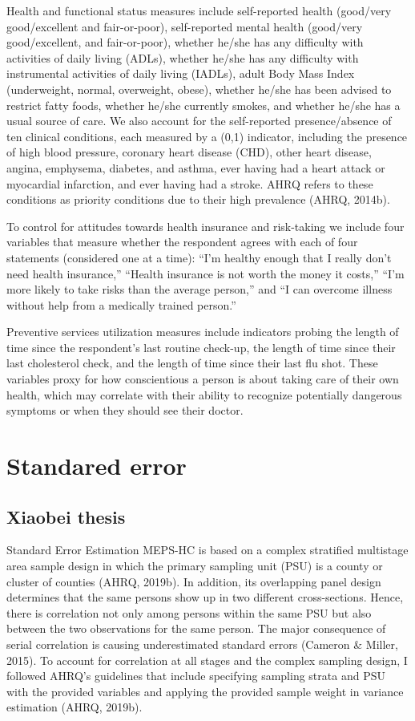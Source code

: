 \documentclass[../main.tex]{subfiles}
\begin{document}
Health and functional status measures include self-reported health (good/very good/excellent and fair-or-poor), self-reported mental health (good/very good/excellent, and fair-or-poor), whether he/she has any difficulty with activities of daily living (ADLs), whether he/she has any difficulty with instrumental activities of daily living (IADLs), adult Body Mass Index (underweight, normal, overweight, obese), whether he/she has been advised to restrict fatty foods, whether he/she currently smokes, and whether he/she has a usual source of care. We also account for the self-reported presence/absence of ten clinical conditions, each measured by a (0,1) indicator, including the presence of high blood pressure, coronary heart disease (CHD), other heart disease, angina, emphysema, diabetes, and asthma, ever having had a heart attack or myocardial infarction, and ever having had a stroke. AHRQ refers to these conditions as priority conditions due to their high prevalence (AHRQ, 2014b).

To control for attitudes towards health insurance and risk-taking we include four variables that measure whether the respondent agrees with each of four statements (considered one at a time): “I'm healthy enough that I really don't need health insurance,” “Health insurance is not worth the money it costs,” “I'm more likely to take risks than the average person,” and “I can overcome illness without help from a medically trained person.”

Preventive services utilization measures include indicators probing the length of time since the respondent's last routine check-up, the length of time since their last cholesterol check, and the length of time since their last flu shot. These variables proxy for how conscientious a person is about taking care of their own health, which may correlate with their ability to recognize potentially dangerous symptoms or when they should see their doctor.

\section{Standared error}
\subsection{Xiaobei thesis }

Standard Error Estimation MEPS-HC is based on a complex stratified multistage area sample design in which the primary sampling unit (PSU) is a county or cluster of counties (AHRQ, 2019b). In addition, its overlapping panel design determines that the same persons show up in two different cross-sections. Hence, there is correlation not only among persons
within the same PSU but also between the two observations for the same person. The major consequence of serial correlation is causing underestimated standard errors (Cameron \& Miller, 2015). To account for correlation at all stages and the complex sampling design, I followed AHRQ’s guidelines that include specifying sampling strata and PSU with the provided variables and applying the provided sample weight in variance estimation (AHRQ, 2019b).
\end{document}
